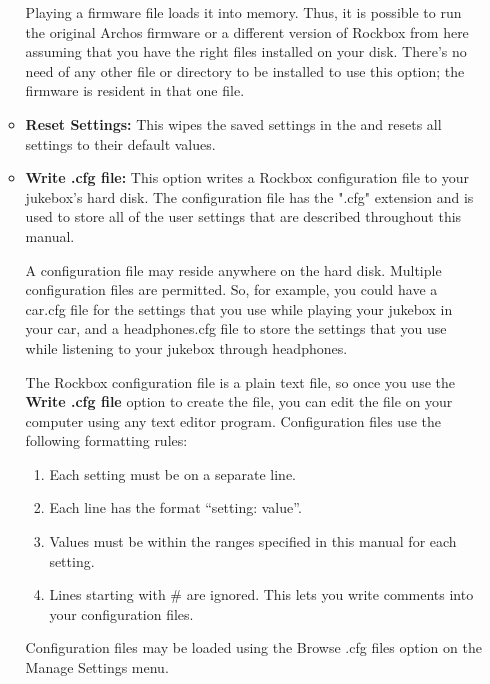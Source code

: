 \begin{itemize}
\begin{itemize}
{      Playing a firmware file loads it into memory.  Thus, it is possible to run the original Archos firmware or a different version of Rockbox from here assuming that you have the right files installed on your disk.  There's no need of any other file or directory to be installed to use this option; the firmware is resident in that one file.
      }
    \item \textbf{Reset Settings: }
      This wipes the saved settings in the \dap and resets all settings to their default values.
    \item \textbf{Write .cfg file: }
			This option writes a Rockbox configuration file to your jukebox's hard disk. The configuration file has the ".cfg" extension and is used to store all of the user settings that are described throughout this manual.

			A configuration file may reside anywhere on the hard disk. Multiple configuration files are permitted. So, for example, you could have a car.cfg file for the settings that you use while playing your jukebox in your car, and a headphones.cfg file to store the settings that you use while listening to your jukebox through headphones.

			The Rockbox configuration file is a plain text file, so once you use the \textbf{Write .cfg file} option to create the file, you can edit the file on your computer using any text editor program. Configuration files use the following formatting rules:

			\begin{enumerate}   
			\item Each setting must be on a separate line.
			\item Each line has the format ``setting: value''. 
			\item Values must be within the ranges specified in this manual for each setting.
			\item Lines starting with # are ignored. This lets you write comments into your configuration files.
			\end{enumerate}

			Configuration files may be loaded using the Browse .cfg files option on the Manage Settings menu.


\end{itemize}
\end{itemize}

